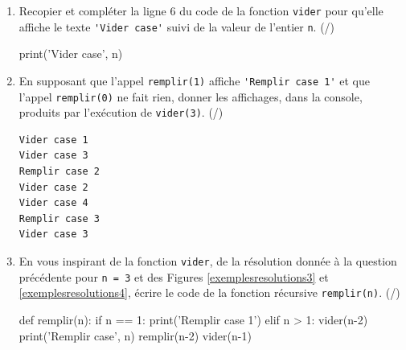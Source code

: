 \begin{enumerate}[resume=monDS]
\item Recopier et compléter la ligne 6 du code de la fonction \texttt{vider} pour qu'elle affiche le texte \verb|'Vider case'| suivi de la valeur de l'entier \texttt{n}.  (/)

\begin{blocvisible}[height=2]
    \begin{CodePythontexAlt}[TaillePolice=\large, Largeur=1\linewidth,Centre,Lignes=true,PremLigne=1]{}
            print('Vider case', n)
    \end{CodePythontexAlt}
\end{blocvisible}

\medskip

\item En supposant que l'appel \texttt{remplir(1)} affiche \verb|'Remplir case 1'| et que l'appel \texttt{remplir(0)} ne fait rien, donner les affichages, dans la console, produits par l'exécution de \texttt{vider(3)}.  (/)
\begin{blocvisible}[height=5]
    \begin{verbatim}
Vider case 1
Vider case 3
Remplir case 2
Vider case 2
Vider case 4
Remplir case 3
Vider case 3
\end{verbatim}
\end{blocvisible}

\pagebreak

\item En vous inspirant de la fonction \texttt{vider}, de la résolution donnée à la question précédente pour \texttt{n = 3} et des Figures \ref{exemplesresolutions3} et \ref{exemplesresolutions4}, écrire le code de la fonction récursive \texttt{remplir(n)}.  (/)

\begin{blocvisible}[height=6]
    \begin{CodePythontexAlt}[TaillePolice=\large, Largeur=1\linewidth,Centre,Lignes=true,PremLigne=1]{}
    def remplir(n):
        if n == 1:
            print('Remplir case 1')
        elif n > 1:
            vider(n-2)
            print('Remplir case', n)
            remplir(n-2)
            vider(n-1)
    \end{CodePythontexAlt}
\end{blocvisible}
\end{enumerate}